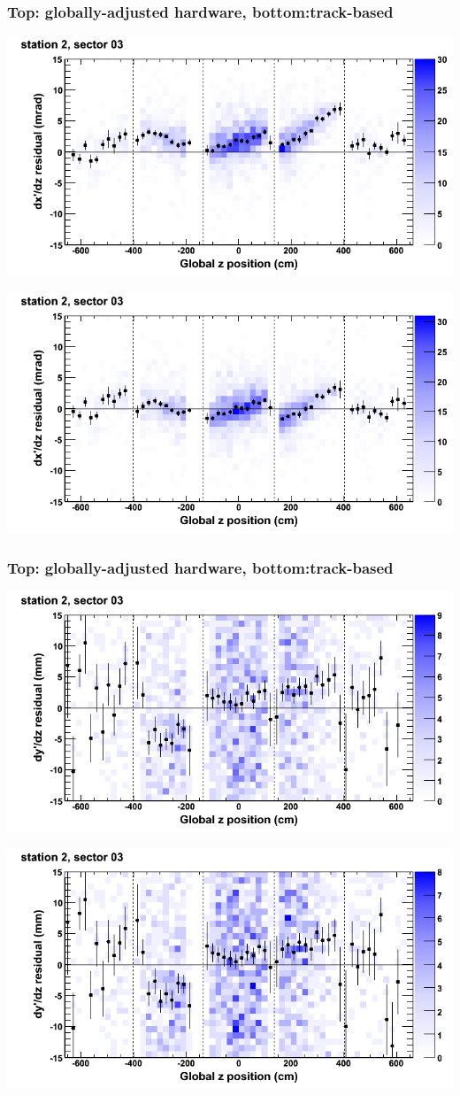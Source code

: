 \documentclass[compress]{beamer}
\begin{document}
\begin{frame}
\frametitle{Top: globally-adjusted hardware, bottom:track-based}
\includegraphics[width=0.7\linewidth]{NOV4_mapplots_HW/DTvsz_st2sec03_dxdz.png}

\includegraphics[width=0.7\linewidth]{NOV4_mapplots/DTvsz_st2sec03_dxdz.png}
\end{frame}

\begin{frame}
\frametitle{Top: globally-adjusted hardware, bottom:track-based}
\includegraphics[width=0.7\linewidth]{NOV4_mapplots_HW/DTvsz_st2sec03_dydz.png}

\includegraphics[width=0.7\linewidth]{NOV4_mapplots/DTvsz_st2sec03_dydz.png}
\end{frame}
\end{document}
